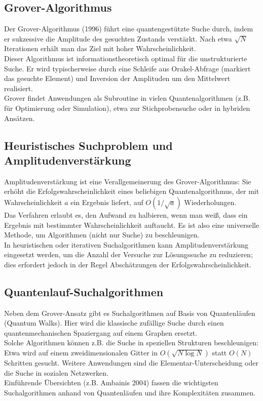 \subsection{Grover-Algorithmus}

Der Grover-Algorithmus (1996) führt eine quantengestützte Suche durch, indem er sukzessive die Amplitude des gesuchten Zustands verstärkt. Nach etwa $\sqrt{N}$ Iterationen erhält man das Ziel mit hoher Wahrscheinlichkeit.\\
Dieser Algorithmus ist informationstheoretisch optimal für die unstrukturierte Suche. Er wird typischerweise durch eine Schleife aus Orakel-Abfrage (markiert das gesuchte Element) und Inversion der Amplituden um den Mittelwert realisiert.\\
Grover findet Anwendungen als Subroutine in vielen Quantenalgorithmen (z.B. für Optimierung oder Simulation), etwa zur Stichprobensuche oder in hybriden Ansätzen.

\subsection{Heuristisches Suchproblem und Amplitudenverstärkung}

Amplitudenverstärkung ist eine Verallgemeinerung des Grover-Algorithmus: Sie erhöht die Erfolgswahrscheinlichkeit eines beliebigen Quantenalgorithmus, der mit Wahrscheinlichkeit $a$ ein Ergebnis liefert, auf $O(1/\sqrt{a})$ Wiederholungen.\\
Das Verfahren erlaubt es, den Aufwand zu halbieren, wenn man weiß, dass ein Ergebnis mit bestimmter Wahrscheinlichkeit auftaucht. Es ist also eine universelle Methode, um Algorithmen (nicht nur Suche) zu beschleunigen.\\
In heuristischen oder iterativen Suchalgorithmen kann Amplitudenverstärkung eingesetzt werden, um die Anzahl der Versuche zur Lösungssuche zu reduzieren; dies erfordert jedoch in der Regel Abschätzungen der Erfolgswahrscheinlichkeit.

\subsection{Quantenlauf-Suchalgorithmen}

Neben dem Grover-Ansatz gibt es Suchalgorithmen auf Basis von Quantenläufen (Quantum Walks). Hier wird die klassische zufällige Suche durch einen quantenmechanischen Spaziergang auf einem Graphen ersetzt.\\
Solche Algorithmen können z.B. die Suche in speziellen Strukturen beschleunigen: Etwa wird auf einem zweidimensionalen Gitter in $O(\sqrt{N\log N})$ statt $O(N)$ Schritten gesucht. Weitere Anwendungen sind die Elementar-Unterscheidung oder die Suche in sozialen Netzwerken.\\
Einführende Übersichten (z.B. Ambainis 2004) fassen die wichtigsten Suchalgorithmen anhand von Quantenläufen und ihre Komplexitäten zusammen.

